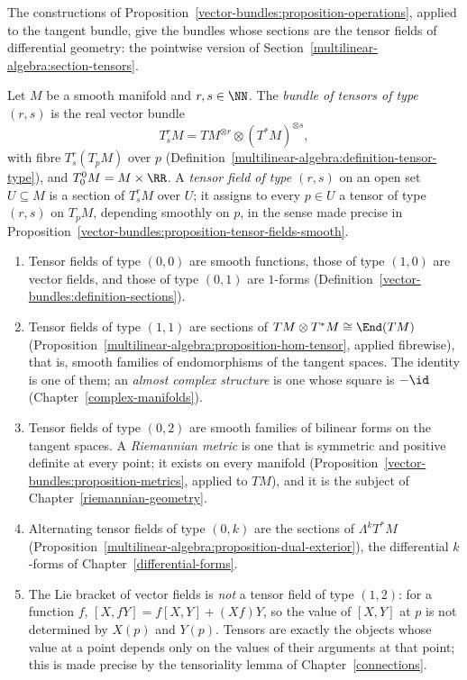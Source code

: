 The constructions of Proposition~\ref{vector-bundles:proposition-operations}, applied to the tangent bundle, give the bundles whose sections are the tensor fields of differential
geometry: the pointwise version of Section~\ref{multilinear-algebra:section-tensors}.

\begin{definition}\label{vector-bundles:definition-tensor-fields}
Let $M$ be a smooth manifold and $r, s \in \NN$. The \emph{bundle of tensors of type $(r,s)$} is the real vector bundle
\[
T^r_sM = TM^{\otimes r} \otimes (T^*M)^{\otimes s},
\]
with fibre $T^r_s(T_pM)$ over $p$ (Definition~\ref{multilinear-algebra:definition-tensor-type}), and $T^0_0M = M \times \RR$. A \emph{tensor field of type $(r,s)$} on an open set $U \subseteq M$ is a
section of $T^r_sM$ over $U$; it assigns to every $p \in U$ a tensor of type $(r,s)$ on $T_pM$, depending smoothly on $p$, in the sense made precise in
Proposition~\ref{vector-bundles:proposition-tensor-fields-smooth}.
\end{definition}

\begin{example}\label{vector-bundles:example-tensor-fields}
\begin{enumerate}
\item Tensor fields of type $(0,0)$ are smooth functions, those of type $(1,0)$ are vector fields, and those of type $(0,1)$ are $1$-forms
(Definition~\ref{vector-bundles:definition-sections}).
\item Tensor fields of type $(1,1)$ are sections of $TM \otimes T^*M \cong \End(TM)$ (Proposition~\ref{multilinear-algebra:proposition-hom-tensor}, applied fibrewise), that is, smooth families of
endomorphisms of the tangent spaces. The identity is one of them; an \emph{almost complex structure} is one whose square is $-\id$ (Chapter~\ref{complex-manifolds}).
\item Tensor fields of type $(0,2)$ are smooth families of bilinear forms on the tangent spaces. A \emph{Riemannian metric} is one that is symmetric and positive definite at every point; it exists
on every manifold (Proposition~\ref{vector-bundles:proposition-metrics}, applied to $TM$), and it is the subject of Chapter~\ref{riemannian-geometry}.
\item Alternating tensor fields of type $(0,k)$ are the sections of $\Lambda^kT^*M$ (Proposition~\ref{multilinear-algebra:proposition-dual-exterior}), the differential $k$-forms of
Chapter~\ref{differential-forms}.
\item The Lie bracket of vector fields is \emph{not} a tensor field of type $(1,2)$: for a function $f$, $[X, fY] = f[X, Y] + (Xf)Y$, so the value of $[X, Y]$ at $p$ is not determined by
$X(p)$ and $Y(p)$. Tensors are exactly the objects whose value at a point depends only on the values of their arguments at that point; this is made precise by the tensoriality lemma of
Chapter~\ref{connections}.
\end{enumerate}
\end{example}

